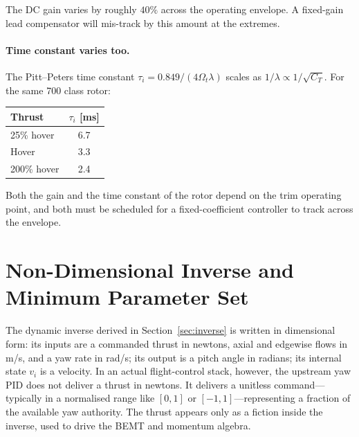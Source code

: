 \documentclass[11pt,a4paper]{article}
\newcommand{\OmegaT}{\Omega_t}
\newcommand{\vi}{v_i}
\let\oldsection\section
\renewcommand{\section}{\clearpage\oldsection}
\begin{document}
The DC gain varies by roughly \(40\%\) across the operating envelope. A
fixed-gain lead compensator will mis-track by this amount at the extremes.

\paragraph{Time constant varies too.}
The Pitt--Peters time constant
\(\tau_i = 0.849/(4\OmegaT\lambda)\) scales as \(1/\lambda\propto 1/\sqrt{C_T}\).
For the same 700 class rotor:

\begin{center}
\renewcommand{\arraystretch}{1.15}
\begin{tabular}{lc}
\toprule
Thrust & \(\tau_i\) [ms] \\
\midrule
25\% hover  & 6.7 \\
Hover       & 3.3 \\
200\% hover & 2.4 \\
\bottomrule
\end{tabular}
\end{center}

Both the gain and the time constant of the rotor depend on the trim
operating point, and both must be scheduled for a fixed-coefficient
controller to track across the envelope.

\section{Non-Dimensional Inverse and Minimum Parameter Set}\label{sec:nondim}

The dynamic inverse derived in Section~\ref{sec:inverse} is written in
dimensional form: its inputs are a commanded thrust in newtons, axial and
edgewise flows in m/s, and a yaw rate in rad/s; its output is a pitch
angle in radians; its internal state \(\vi\) is a velocity. In an actual
flight-control stack, however, the upstream yaw PID does not deliver a
thrust in newtons. It delivers a unitless command---typically in a
normalised range like \([0,1]\) or \([-1,1]\)---representing a fraction of
the available yaw authority. The thrust appears only as a fiction inside
the inverse, used to drive the BEMT and momentum algebra.
\end{document}
